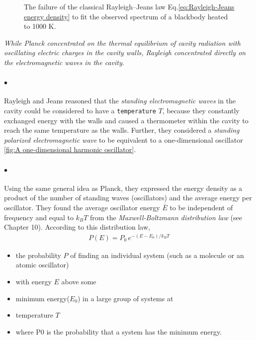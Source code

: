 \documentclass[a4paper]{report}
\begin{document}
\begin{figure}
                \caption{The failure of the classical Rayleigh–Jeans law Eq.\eqref{eq:Rayleigh-Jeans energy density} 
                to fit the observed spectrum of a blackbody heated to 1000 K.}
                \label{fig:spectral energy density}
            \end{figure}   

            \textit{While Planck concentrated on the thermal equilibrium of cavity radiation with oscillating electric charges in 
            the cavity walls, Rayleigh concentrated directly on the electromagnetic waves in the cavity}. 
            \paragraph{\color{c3}$\bullet$}Rayleigh and Jeans 
            reasoned that the \textit{standing electromagnetic waves} in the cavity could be considered to have a \texttt{temperature} $T$, 
            because they constantly exchanged energy with the walls and caused a thermometer within the cavity to reach 
            the same temperature as the walls. Further, they considered a \textit{standing polarized electromagnetic wave} to be 
            equivalent to a one-dimensional oscillator \eqref{fig:A one-dimensional harmonic oscillator}. 

            \paragraph{\color{c3}$\bullet$}Using the same general idea as Planck, they expressed 
            the energy density as a product of the number of standing waves (oscillators) and the average energy per 
            oscillator. They found the average oscillator energy $\bar{E}$ to be independent of frequency and equal to $k_B T$ from 
            the \textit{Maxwell-Boltzmann distribution law} (see Chapter 10). According to this distribution law, 
            \begin{align}
                \label{eq:probability of finding a system}
                P(E) = P_0\, e^{-(E-E_0)/k_B T}
            \end{align}
            {\tiny \begin{itemize}
                \item the probability $P$ of finding an individual system (such as a molecule or an atomic oscillator) 
                \item with energy $E$ above some  
                \item minimum energy($E_0$) in a large group of systems at 
                \item temperature $T$
                \item where P0 is the probability that a system has the minimum energy.
            \end{itemize}}
            
\end{document}
